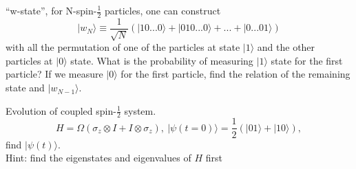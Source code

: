\documentclass[UTF8,12pt]{article} %
\begin{document}
\begin{exercise}{}{}
``w-state'', for N-spin-$\frac{1}{2}$ particles, one can construct
$$|w_{N}\rangle \equiv \frac{1}{\sqrt{N}}(|10...0\rangle + |010...0\rangle + ... + |0...01\rangle)$$
with all the permutation of one of the particles at state $|1\rangle$ and the other particles at $|0\rangle$ state. What is the probability of measuring $|1\rangle$ state for the first particle? If we measure $|0\rangle$ for the first particle, find the relation of the remaining state and $|w_{N-1}\rangle$.
\end{exercise}


\begin{exercise}{}{}
Evolution of coupled spin-$\frac{1}{2}$ system.
$$H = \Omega(\sigma_{z}\otimes I + I\otimes \sigma_{z}),~ |\psi(t=0)\rangle = \frac{1}{2}(|01\rangle + |10\rangle),$$
find $|\psi(t)\rangle$.\\
Hint: find the eigenstates and eigenvalues of $H$ first
\end{exercise}
\end{document}

